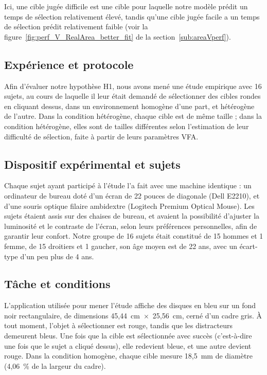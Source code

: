 	Ici, une cible \og jugée difficile \fg{} est une cible pour laquelle notre modèle prédit un temps de sélection relativement élevé, tandis qu'une cible \og jugée facile \fg{} a un temps de sélection prédit relativement faible (voir la figure~\ref{fig:perf_V_RealArea_better_fit} de la section~\ref{sub:areaVperf}).
	
	\subsection{Expérience et protocole}
	\label{sub:as_protocol}
	Afin d'évaluer notre hypothèse H1, nous avons mené une étude empirique avec 16 sujets, au cours de laquelle il leur était demandé de sélectionner des cibles rondes en cliquant dessus, dans un environnement homogène d'une part, et hétérogène de l'autre. Dans la condition hétérogène, chaque cible est de même taille ; dans la condition hétérogène, elles sont de tailles différentes selon l'estimation de leur difficulté de sélection, faite à partir de leurs paramètres VFA.
	
	\subsection{Dispositif expérimental et sujets}
	Chaque sujet ayant participé à l'étude l'a fait avec une machine identique : un ordinateur de bureau doté d'un écran de 22 pouces de diagonale (Dell E2210), et d'une souris optique filaire ambidextre (Logitech Premium Optical Mouse). Les sujets étaient assis sur des chaises de bureau, et avaient la possibilité d'ajuster la luminosité et le contraste de l'écran, selon leurs préférences personnelles, afin de garantir leur confort. Notre groupe de 16 sujets était constitué de 15 hommes et 1 femme, de 15 droitiers et 1 gaucher, son âge moyen est de 22 ans, avec un écart-type d'un peu plus de 4 ans.
	
	\subsection{Tâche et conditions}
	L'application utilisée pour mener l'étude affiche des disques en bleu sur un fond noir rectangulaire, de dimensions 45,44~cm~$\times$~25,56~cm, cerné d'un cadre gris. À tout moment, l'objet à sélectionner est rouge, tandis que les distracteurs demeurent bleus. Une fois que la cible est sélectionnée avec succès (c'est-à-dire une fois que le sujet a cliqué dessus), elle redevient bleue, et une autre devient rouge. Dans la condition homogène, chaque cible mesure 18,5~mm de diamètre (4,06~\%{} de la largeur du cadre).
	
